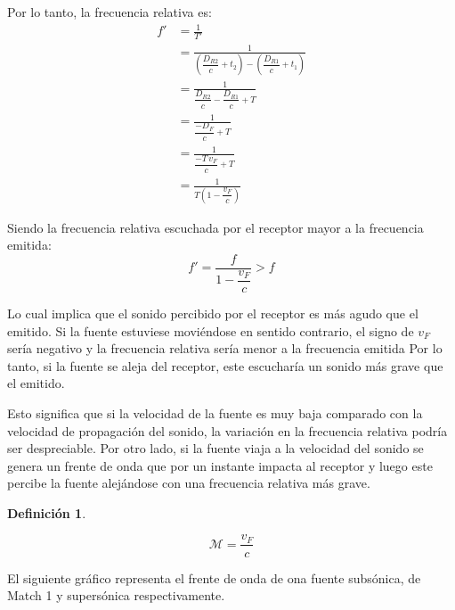 \documentclass[a5paper,12pt,twoside]{book}
\newtheorem{defn}{{Definición}}[chapter]
\begin{document}
Por lo tanto, la frecuencia relativa es:
\begin{align*}
    f' &= \frac{1}{T'}
    \\
    &= \frac{1}{\left( \dfrac{D_{R2}}{c}+t_2 \right) - \left( \dfrac{D_{R1}}{c}+t_1 \right)}
    \\
    &= \frac{1}{\dfrac{D_{R2}}{c} - \dfrac{D_{R1}}{c} + T}
    \\
    &= \frac{1}{\dfrac{-D_F}{c} + T}
    \\
    &= \frac{1}{\dfrac{-T \, v_F}{c} + T}
    \\
    &= \frac{1}{T\left(1-\dfrac{v_F}{c}\right)}
\end{align*}

Siendo la frecuencia relativa escuchada por el receptor mayor a la frecuencia emitida:
\begin{equation*}
    f' = \frac{f}{1-\dfrac{v_F}{c}} > f
\end{equation*}

Lo cual implica que el sonido percibido por el receptor es más agudo que el emitido.
Si la fuente estuviese moviéndose en sentido contrario, el signo de $v_F$ sería negativo y la frecuencia relativa sería menor a la frecuencia emitida
Por lo tanto, si la fuente se aleja del receptor, este escucharía un sonido más grave que el emitido.

Esto significa que si la velocidad de la fuente es muy baja comparado con la velocidad de propagación del sonido, la variación en la frecuencia relativa podría ser despreciable.
Por otro lado, si la fuente viaja a la velocidad del sonido se genera un frente de onda que por un instante impacta al receptor y luego este percibe la fuente alejándose con una frecuencia relativa más grave.

\begin{mdframed}[style=DefinitionFrame]
    \begin{defn}
    \end{defn}
    \begin{equation*}
        \mathcal{M} = \frac{v_F}{c}
    \end{equation*}
\end{mdframed}

El siguiente gráfico representa el frente de onda de ona fuente subsónica, de Match 1 y supersónica respectivamente.
\end{document}
